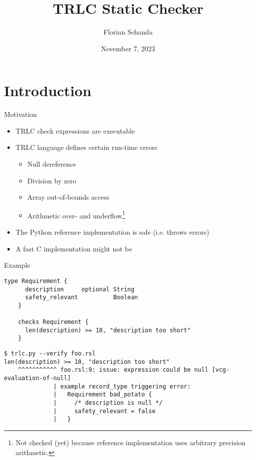 \documentclass[aspectratio=169]{beamer}
\author{Florian Schanda}
\title{TRLC Static Checker}
\date{November 7, 2023}
\begin{document}
\maketitle

\section{Introduction}
\begin{frame}{Motivation}
  \begin{itemize}
  \item TRLC check expressions are executable
  \item TRLC language defines certain run-time errors
    \begin{itemize}
    \item Null dereference
    \item Division by zero
    \item Array out-of-bounds access
    \item Arithmetic over- and underflow\footnote{Not checked (yet)
        because reference implementation uses arbitrary precision
        arithmetic.}
    \end{itemize}
  \item The Python reference implementation is safe (i.e. throws errors)
  \item A fast C implementation might not be
  \end{itemize}
\end{frame}

\begin{frame}[fragile]{Example}
  \begin{lstlisting}[language=TRLC,gobble=4]
    type Requirement {
      description     optional String
      safety_relevant          Boolean
    }

    checks Requirement {
      len(description) >= 10, "description too short"
    }
  \end{lstlisting}
  \pause
  \begin{scriptsize}
\begin{verbatim}
$ trlc.py --verify foo.rsl
len(description) >= 10, "description too short"
    ^^^^^^^^^^^ foo.rsl:9: issue: expression could be null [vcg-evaluation-of-null]
              | example record_type triggering error:
              |   Requirement bad_potato {
              |     /* description is null */
              |     safety_relevant = false
              |   }
\end{verbatim}
  \end{scriptsize}
\end{frame}
\end{document}
